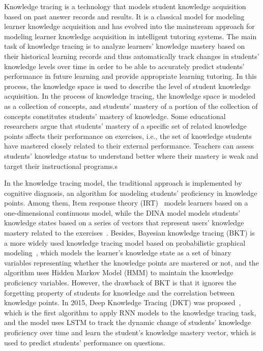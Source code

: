 Knowledge tracing is a technology that models student knowledge acquisition based on past answer records and results. It is a classical model for modeling learner knowledge acquisition and has evolved into the mainstream approach for modeling learner knowledge acquisition in intelligent tutoring systems. The main task of knowledge tracing is to analyze learners' knowledge mastery based on their historical learning records and thus automatically track changes in students' knowledge levels over time in order to be able to accurately predict students' performance in future learning and provide appropriate learning tutoring. In this process, the knowledge space is used to describe the level of student knowledge acquisition. In the process of knowledge tracing, the knowledge space is modeled as a collection of concepts, and students' mastery of a portion of the collection of concepts constitutes students' mastery of knowledge. Some educational researchers argue that students' mastery of a specific set of related knowledge points affects their performance on exercises, i.e., the set of knowledge students have mastered closely related to their external performance. Teachers can assess students' knowledge status to understand better where their mastery is weak and target their instructional programs.s

In the knowledge tracing model, the traditional approach is implemented by cognitive diagnosis, an algorithm for modeling students' proficiency in knowledge points. Among them, Item response theory (IRT)~\cite{pliakos_integrating_2019} models learners based on a one-dimensional continuous model, while the DINA model models students' knowledge states based on a series of vectors that represent users' knowledge mastery related to the exercises~\cite{huang2020utilizing}. Besides, Bayesian knowledge tracing (BKT) is a more widely used knowledge tracing model based on probabilistic graphical modeling~\cite{yudelson2013individualized}, which models the learner's knowledge state as a set of binary variables representing whether the knowledge points are mastered or not, and the algorithm uses Hidden Markov Model (HMM) to maintain the knowledge proficiency variables. However, the drawback of BKT is that it ignores the forgetting property of students for knowledge and the correlation between knowledge points. In 2015, Deep Knowledge Tracing (DKT) was proposed~\cite{piech2015deep}, which is the first algorithm to apply RNN models to the knowledge tracing task, and the model uses LSTM to track the dynamic change of students' knowledge proficiency over time and learn the student's knowledge mastery vector, which is used to predict students' performance on questions.

